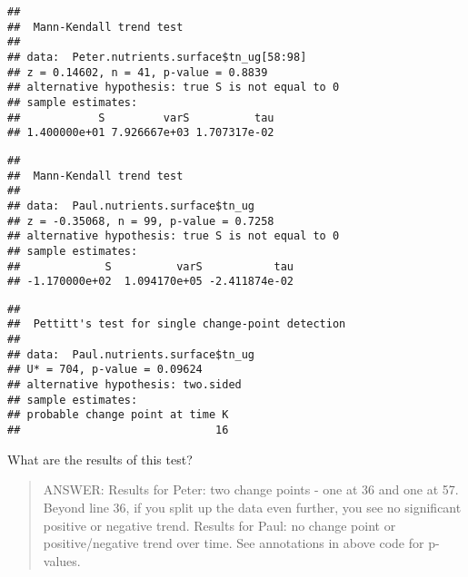 \documentclass[]{article}
\newenvironment{Shaded}{\begin{snugshade}}{\end{snugshade}}
\newcommand{\KeywordTok}[1]{\textcolor[rgb]{0.13,0.29,0.53}{\textbf{#1}}}
\newcommand{\CommentTok}[1]{\textcolor[rgb]{0.56,0.35,0.01}{\textit{#1}}}
\newcommand{\OperatorTok}[1]{\textcolor[rgb]{0.81,0.36,0.00}{\textbf{#1}}}
\newcommand{\NormalTok}[1]{#1}
\begin{document}
\begin{verbatim}
## 
##  Mann-Kendall trend test
## 
## data:  Peter.nutrients.surface$tn_ug[58:98]
## z = 0.14602, n = 41, p-value = 0.8839
## alternative hypothesis: true S is not equal to 0
## sample estimates:
##            S         varS          tau 
## 1.400000e+01 7.926667e+03 1.707317e-02
\end{verbatim}

\begin{Shaded}
\end{Shaded}

\begin{verbatim}
## 
##  Mann-Kendall trend test
## 
## data:  Paul.nutrients.surface$tn_ug
## z = -0.35068, n = 99, p-value = 0.7258
## alternative hypothesis: true S is not equal to 0
## sample estimates:
##             S          varS           tau 
## -1.170000e+02  1.094170e+05 -2.411874e-02
\end{verbatim}

\begin{Shaded}
\end{Shaded}

\begin{verbatim}
## 
##  Pettitt's test for single change-point detection
## 
## data:  Paul.nutrients.surface$tn_ug
## U* = 704, p-value = 0.09624
## alternative hypothesis: two.sided
## sample estimates:
## probable change point at time K 
##                              16
\end{verbatim}

What are the results of this test?

\begin{quote}
ANSWER: Results for Peter: two change points - one at 36 and one at 57.
Beyond line 36, if you split up the data even further, you see no
significant positive or negative trend. Results for Paul: no change
point or positive/negative trend over time. See annotations in above
code for p-values.
\end{quote}
\end{document}
